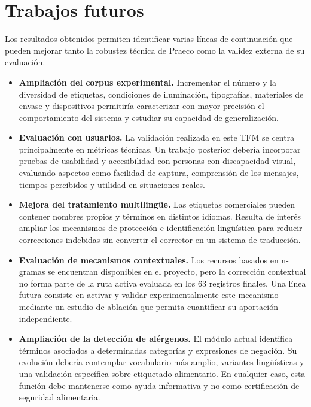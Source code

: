\section{Trabajos futuros}

Los resultados obtenidos permiten identificar varias líneas de continuación que pueden mejorar tanto la robustez técnica de Praeco como la validez externa de su evaluación.

\begin{itemize}[noitemsep]
    \item \textbf{Ampliación del corpus experimental.} Incrementar el número y la diversidad de etiquetas, condiciones de iluminación, tipografías, materiales de envase y dispositivos permitiría caracterizar con mayor precisión el comportamiento del sistema y estudiar su capacidad de generalización.

    \item \textbf{Evaluación con usuarios.} La validación realizada en este TFM se centra principalmente en métricas técnicas. Un trabajo posterior debería incorporar pruebas de usabilidad y accesibilidad con personas con discapacidad visual, evaluando aspectos como facilidad de captura, comprensión de los mensajes, tiempos percibidos y utilidad en situaciones reales.

    \item \textbf{Mejora del tratamiento multilingüe.} Las etiquetas comerciales pueden contener nombres propios y términos en distintos idiomas. Resulta de interés ampliar los mecanismos de protección e identificación lingüística para reducir correcciones indebidas sin convertir el corrector en un sistema de traducción.

    \item \textbf{Evaluación de mecanismos contextuales.} Los recursos basados en n-gramas se encuentran disponibles en el proyecto, pero la corrección contextual no forma parte de la ruta activa evaluada en los 63 registros finales. Una línea futura consiste en activar y validar experimentalmente este mecanismo mediante un estudio de ablación que permita cuantificar su aportación independiente.

    \item \textbf{Ampliación de la detección de alérgenos.} El módulo actual identifica términos asociados a determinadas categorías y expresiones de negación. Su evolución debería contemplar vocabulario más amplio, variantes lingüísticas y una validación específica sobre etiquetado alimentario. En cualquier caso, esta función debe mantenerse como ayuda informativa y no como certificación de seguridad alimentaria.


\end{itemize}
